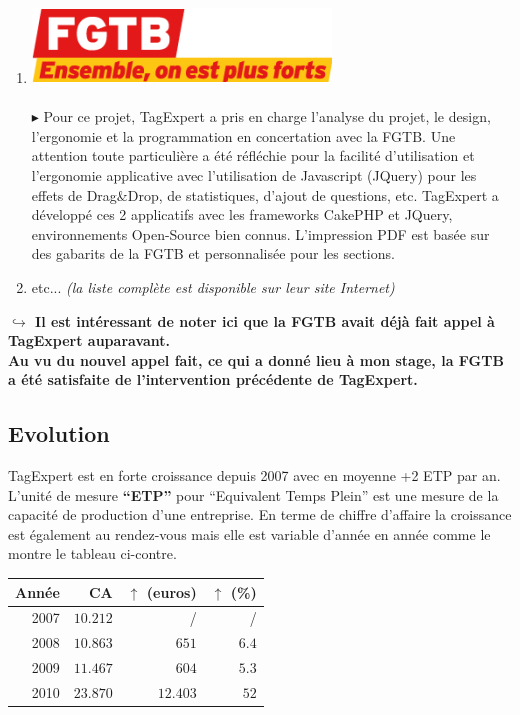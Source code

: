 \documentclass{article}
\begin{document}
\begin{sffamily}
\begin{enumerate}
\begin{itemize}
\end{itemize}
\item[] \includegraphics[scale=0.4]{fgtb.png} \\$ $\\
$\blacktriangleright$ Pour ce projet, TagExpert a pris en charge l'analyse du projet, le design, l'ergonomie et la programmation en concertation avec la FGTB.
Une	 attention toute particulière a été réfléchie pour la facilité d'utilisation et l'ergonomie applicative avec l'utilisation de Javascript (JQuery) pour les effets de 
Drag\&{}Drop, de statistiques, d'ajout de questions, etc.
TagExpert a développé ces 2 applicatifs avec les frameworks CakePHP et JQuery, environnements Open-Source bien connus.
L'impression PDF est basée sur des gabarits de la FGTB et personnalisée pour les sections. \\
\item[] etc... \textit{(la liste complète est disponible sur leur site Internet)} \\
\end{enumerate}

\noindent \textbf{$\hookrightarrow$ Il est intéressant de noter ici que la FGTB avait déjà fait appel à TagExpert auparavant.\\
\indent Au vu du nouvel appel fait, ce qui a donné lieu à mon stage, la FGTB a été satisfaite de \indent l'intervention précédente de TagExpert.}

\subsection{Evolution}

TagExpert est en forte croissance depuis 2007 avec en moyenne +2 ETP par an. L'unité de mesure \textbf{``ETP''} pour ``Equivalent Temps Plein'' est une mesure de la capacité 
de production d'une entreprise. En terme de chiffre d’affaire la croissance est également au rendez-vous mais elle est variable d’année en année comme le montre le tableau 
ci-contre.

\begin{center}
\begin{tabular}{rrrr}
Année & CA & $\uparrow$ (euros) & $\uparrow$ (\%)\\
\hline
2007 & $10.212$ & / & / \\
2008 & $10.863$ & $651$ & $6.4$ \\
2009 & $11.467$ & $604$ & $5.3$ \\
2010 & $23.870$ & $12.403$ & $52$
\end{tabular}
\end{center}


\end{sffamily}
\end{document}
